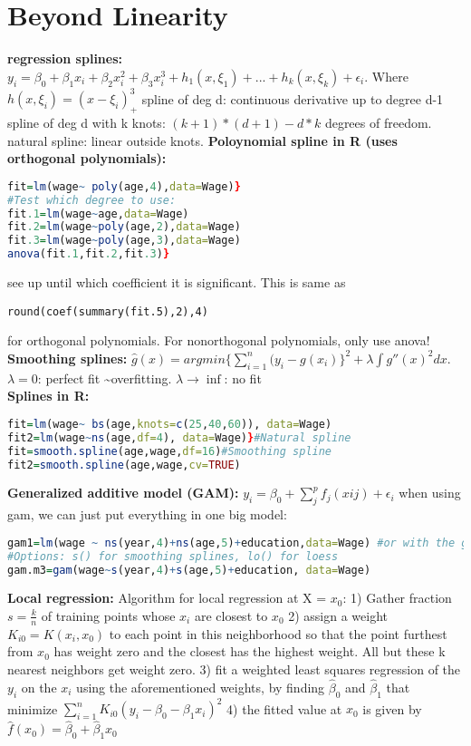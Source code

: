 \section{Beyond Linearity}
\textbf{regression splines: } 
$y_i = \beta_0 + \beta_1x_i + \beta_2x_i^2 + \beta_3x_i^3 + h_1(x, \xi_1) + ... + h_k(x, \xi_k) + \epsilon_i$. Where $h(x, \xi_i) = (x-\xi_i)^3_+$
spline of deg d: continuous derivative up to degree d-1
spline of deg d with k knots: $(k+1)*(d+1)-d*k$ degrees of freedom. 
natural spline: linear outside knots. 
\textbf{Poloynomial spline in R (uses orthogonal polynomials):} \begin{lstlisting}[language=R]
fit=lm(wage~ poly(age,4),data=Wage)}
#Test which degree to use:
fit.1=lm(wage~age,data=Wage)
fit.2=lm(wage~poly(age,2),data=Wage)
fit.3=lm(wage~poly(age,3),data=Wage)
anova(fit.1,fit.2,fit.3)}\end{lstlisting} see up until which coefficient it is significant. This is same as \begin{lstlisting}
round(coef(summary(fit.5),2),4)
\end{lstlisting} for orthogonal polynomials. For nonorthogonal polynomials, only use anova! \\
\textbf{Smoothing splines: } $\hat g(x) = argmin \{\sum_{i=1}^n (y_i - g(x_i)\}^2 + \lambda \int g'' (x)^2 dx$. $\lambda = 0$: perfect fit \textasciitilde overfitting. $\lambda \rightarrow \inf$: no fit \\
\textbf{Splines in R:}
\begin{lstlisting}[language=R] 
fit=lm(wage~ bs(age,knots=c(25,40,60)), data=Wage)
fit2=lm(wage~ns(age,df=4), data=Wage)}#Natural spline
fit=smooth.spline(age,wage,df=16)#Smoothing spline
fit2=smooth.spline(age,wage,cv=TRUE)
\end{lstlisting}
\textbf{Generalized additive model (GAM): } $y_i = \beta_0 + \sum_j^p f_j(xij) + \epsilon_i$
when using gam, we can just put everything in one big model:
\begin{lstlisting}[language=R]
gam1=lm(wage ~ ns(year,4)+ns(age,5)+education,data=Wage) #or with the gam library: 
#Options: s() for smoothing splines, lo() for loess
gam.m3=gam(wage~s(year,4)+s(age,5)+education, data=Wage)\end{lstlisting}

\textbf{Local regression: }
Algorithm for local regression at X = $x_0$: 1) Gather fraction $s = \frac{k}{n}$ of training points whose $x_i$ are closest to $x_0$ 2) assign a weight $K_{i0} = K(x_i, x_0)$ to each point in this neighborhood so that the point furthest from $x_0$ has weight zero and the closest has the highest weight. All but these k nearest neighbors get weight zero. 3) fit a weighted least squares regression of the $y_i$ on the $x_i$ using the aforementioned weights, by finding $\hat \beta_0$ and $\hat \beta_1$ that minimize $\sum_{i=1}^n K_{i0}(y_i-\beta_0-\beta_1x_i)^2$ 4) the fitted value at $x_0$ is given by $\hat f(x_0) = \hat \beta_0 + \hat \beta_1 x_0$